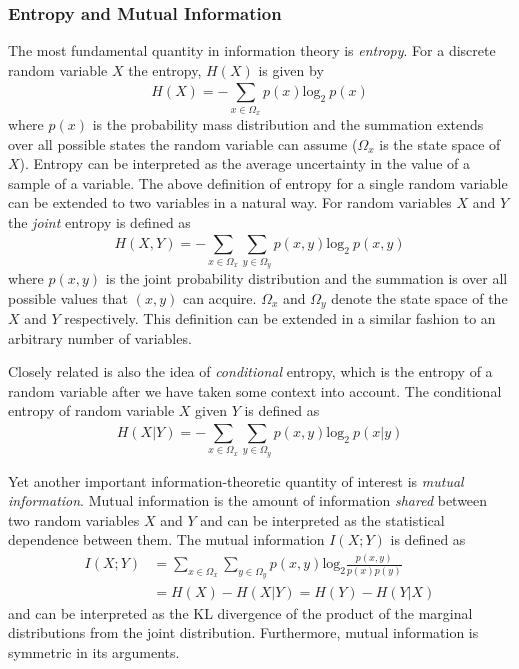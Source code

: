 \documentclass[12pt]{article}
\begin{document}
\subsubsection{Entropy and Mutual Information}
The most fundamental quantity in information theory is \textit{entropy}. For a discrete random variable $X$ the entropy, $H(X)$ is given by
\begin{equation*}
H(X) = -\sum_{x \in \Omega_x}^{} p(x)\text{log}_{2}~p(x)
\end{equation*}
where $p(x)$ is the probability mass distribution and the summation extends over all possible states the random variable can assume ($\Omega_x$ is the state space of $X$). Entropy can be interpreted as the average uncertainty in the value of a sample of a variable. 
The above definition of entropy for a single random variable can be extended to two variables in a natural way. For random variables $X$ and $Y$ the \textit{joint} entropy is defined as 
\begin{equation*}
H(X, Y) = -\sum_{x \in \Omega_x}^{}\sum_{y \in \Omega_y}^{}p(x,y)\text{log}_2~p(x,y)
\end{equation*}
where $p(x,y)$ is the joint probability distribution and the summation is over all possible values that $(x,y)$ can acquire. $\Omega_x$ and $\Omega_y$ denote the state space of the $X$ and $Y$ respectively. This definition can be extended in a similar fashion to an arbitrary number of variables. 

Closely related is also the idea of \textit{conditional} entropy, which is the entropy of a random variable after we have taken some context into account. The conditional entropy of random variable $X$ given $Y$ is defined as 
\begin{equation*}
H(X|Y) = -\sum_{x \in \Omega_x}^{}\sum_{y \in \Omega_y}^{}p(x, y)\text{log}_2~p(x|y)
\end{equation*}

Yet another important information-theoretic quantity of interest is \textit{mutual information}. Mutual information is the amount of information \textit{shared} between two random variables $X$ and $Y$ and can be interpreted as the statistical dependence between them. The mutual information $I(X;Y)$ is defined as 
\begin{align*}
I(X;Y) &= \sum_{x \in \Omega_x}^{}\sum_{y \in \Omega_y}^{}p(x,y)\text{log}_2\frac{p(x,y)}{p(x)p(y)} \\
&=  H(X) - H(X|Y) = H(Y) - H(Y|X)
\end{align*}
and can be interpreted as the KL divergence of the product of the marginal distributions from the joint distribution. Furthermore, mutual information is symmetric in its arguments. 
\end{document}
